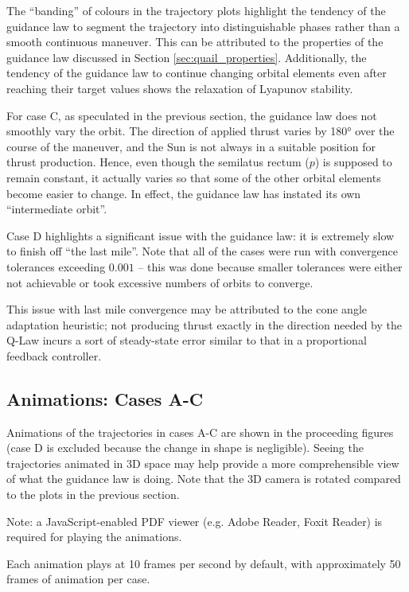 \newpage
The ``banding'' of colours in the trajectory plots highlight the tendency of the guidance law to segment the trajectory into distinguishable phases rather than a smooth continuous maneuver. This can be attributed to the properties of the guidance law discussed in Section \ref{sec:quail_properties}. Additionally, the tendency of the guidance law to continue changing orbital elements even after reaching their target values shows the relaxation of Lyapunov stability.

For case C, as speculated in the previous section, the guidance law does not smoothly vary the orbit. The direction of applied thrust varies by \ang{180} over the course of the maneuver, and the Sun is not always in a suitable position for thrust production. Hence, even though the semilatus rectum (\(p\)) is supposed to remain constant, it actually varies so that some of the other orbital elements become easier to change. In effect, the guidance law has instated its own ``intermediate orbit''.

Case D highlights a significant issue with the guidance law: it is extremely slow to finish off ``the last mile''. Note that all of the cases were run with convergence tolerances exceeding \(0.001\) -- this was done because smaller tolerances were either not achievable or took excessive numbers of orbits to converge.

This issue with last mile convergence may be attributed to the cone angle adaptation heuristic; not producing thrust exactly in the direction needed by the Q-Law incurs a sort of steady-state error similar to that in a proportional feedback controller.

\subsection{Animations: Cases A-C}
Animations of the trajectories in cases A-C are shown in the proceeding figures (case D is excluded because the change in shape is negligible). Seeing the trajectories animated in 3D space may help provide a more comprehensible view of what the guidance law is doing. Note that the 3D camera is rotated compared to the plots in the previous section.

Note: a JavaScript-enabled PDF viewer (e.g. Adobe Reader, Foxit Reader) is required for playing the animations.

Each animation plays at 10 frames per second by default, with approximately 50 frames of animation per case.

